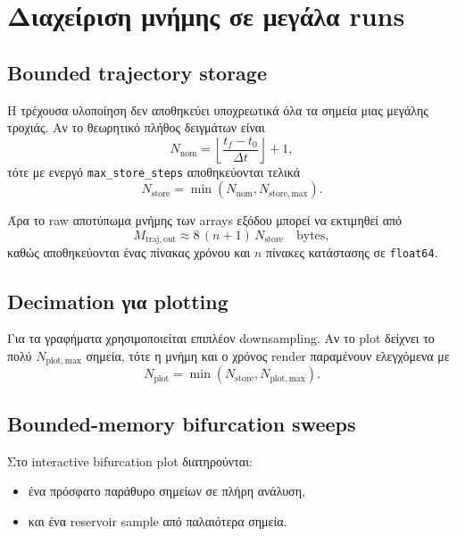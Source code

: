 \section{Διαχείριση μνήμης σε μεγάλα runs}
\label{app:ch2-memory}

\subsection{Bounded trajectory storage}

Η τρέχουσα υλοποίηση δεν αποθηκεύει υποχρεωτικά όλα τα σημεία μιας μεγάλης
τροχιάς. Αν το θεωρητικό πλήθος δειγμάτων είναι
\begin{equation}
N_{\mathrm{nom}}=
\left\lfloor\frac{t_f-t_0}{\Delta t}\right\rfloor + 1,
\end{equation}
τότε με ενεργό \texttt{max\_store\_steps} αποθηκεύονται τελικά
\begin{equation}
N_{\mathrm{store}}=
\min\!\left(N_{\mathrm{nom}},N_{\mathrm{store,max}}\right).
\end{equation}

Άρα το raw αποτύπωμα μνήμης των arrays εξόδου μπορεί να εκτιμηθεί από
\begin{equation}
M_{\mathrm{traj,out}}
\approx
8\,(n+1)\,N_{\mathrm{store}}
\quad \text{bytes},
\end{equation}
καθώς αποθηκεύονται ένας πίνακας χρόνου και \(n\) πίνακες κατάστασης σε
\texttt{float64}.

\subsection{Decimation για plotting}

Για τα γραφήματα χρησιμοποιείται επιπλέον downsampling. Αν το plot δείχνει
το πολύ \(N_{\mathrm{plot,max}}\) σημεία, τότε η μνήμη και ο χρόνος render
παραμένουν ελεγχόμενα με
\begin{equation}
N_{\mathrm{plot}}=
\min\!\left(N_{\mathrm{store}},N_{\mathrm{plot,max}}\right).
\end{equation}

\subsection{Bounded-memory bifurcation sweeps}

Στο interactive bifurcation plot διατηρούνται:
\begin{itemize}
\item ένα πρόσφατο παράθυρο σημείων σε πλήρη ανάλυση,
\item και ένα reservoir sample από παλαιότερα σημεία.
\end{itemize}

